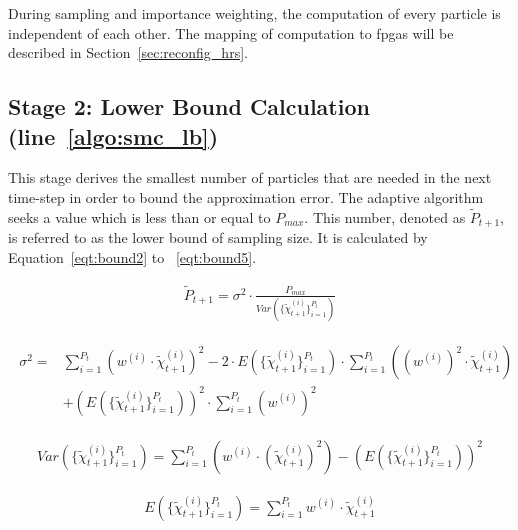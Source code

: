 During sampling and importance weighting, the computation of every particle is independent of each other. 
The mapping of computation to \gls{fpga}s will be described in Section~\ref{sec:reconfig_hrs}.

\subsection[Stage 2: Lower Bound Calculation]{Stage 2: Lower Bound Calculation (line~\ref{algo:smc_lb})} 
This stage derives the smallest number of particles that are needed in the next time-step in order to bound the approximation error.
The adaptive algorithm seeks a value which is less than or equal to $P_{max}$.
This number, denoted as $\widetilde{P}_{t+1}$, is referred to as the lower bound of sampling size.
It is calculated by Equation~\ref{eqt:bound2} to ~\ref{eqt:bound5}.

\begin{equation}
\begin{aligned}
\widetilde{P}_{t+1} = \sigma^2 \cdot \frac{P_{max}}{Var(\{\widetilde{\chi}_{t+1}^{(i)}\}^{P_t}_{i=1})}
\end{aligned}
\label{eqt:bound2}
\end{equation}

\begin{eqnarray}
\begin{aligned}
\sigma^2 = & \sum_{i=1}^{P_{t}}\left({w}^{(i)} \cdot \widetilde{\chi}_{t+1}^{(i)} \right)^2 - 2 \cdot E(\{\widetilde{\chi}_{t+1}^{(i)}\}^{P_t}_{i=1}) \cdot \sum_{i=1}^{P_{t}} \left ( ({w}^{(i)})^2 \cdot \widetilde{\chi}_{t+1}^{(i)} \right ) \\
& + \left(E(\{\widetilde{\chi}_{t+1}^{(i)}\}^{P_t}_{i=1})\right)^2 \cdot \sum_{i=1}^{P_{t}}({w}^{(i)})^2
\end{aligned}
\label{eqt:bound3}
\end{eqnarray}

\begin{equation}
\begin{aligned}
Var(\{\widetilde{\chi}_{t+1}^{(i)}\}^{P_t}_{i=1}) = \sum_{i=1}^{P_{t}} \left ( {w}^{(i)} \cdot (\widetilde{\chi}_{t+1}^{(i)})^2 \right ) - \left( E(\{\widetilde{\chi}_{t+1}^{(i)}\}^{P_t}_{i=1}) \right)^2
\end{aligned}
\label{eqt:bound4}
\end{equation}

\begin{equation}
\begin{aligned}
E(\{\widetilde{\chi}_{t+1}^{(i)}\}^{P_t}_{i=1}) = \sum_{i=1}^{P_{t}} {w}^{(i)} \cdot \widetilde{\chi}_{t+1}^{(i)}
\end{aligned}
\label{eqt:bound5}
\end{equation}

